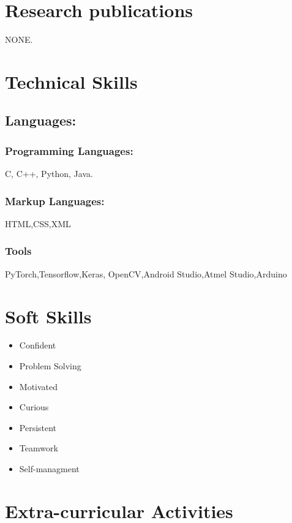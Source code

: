 \documentclass[10pt]{article}
\begin{document}
\section{Research publications}
	NONE.
\section{Technical Skills}
	\subsection{Languages:}
		\subsubsection{Programming Languages: }
			C, C++, Python, Java.
		\subsubsection{Markup Languages:}
			HTML,CSS,XML
		\subsubsection{Tools}
			PyTorch,Tensorflow,Keras, OpenCV,Android Studio,Atmel Studio,Arduino

\section{Soft Skills}
	\begin{multicols}{2}
	\begin{itemize}
	\item Confident \\
 	\item Problem Solving\\
	\item Motivated\\ 
	\item Curious\\
	\columnbreak
	\item Persistent \\
	\item Teamwork\\
	\item Self-managment\\
	\end{itemize}
	\end{multicols}


\section{Extra-curricular Activities}
\end{document}
